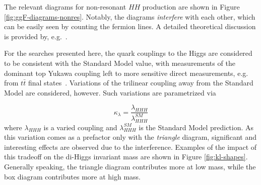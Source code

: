 The relevant diagrams for non-resonant $HH$ production are shown in Figure \ref{fig:ggF-diagrams-nonres}.
Notably, the diagrams \emph{interfere} with each other, which can be easily seen by counting the fermion lines. 
A detailed theoretical discussion is provided by, e.g.~\cite{Dawson-2015}.

For the searches presented here, the quark couplings to the Higgs are considered to be consistent with the Standard 
Model value, with measurements of the dominant top Yukawa coupling left to more sensitive direct measurements, e.g. from 
$t\bar{t}$ final states~\cite{top-Yukawa}. Variations of the trilinear coupling away from the Standard 
Model are considered, however. Such variations are parametrized via 

\begin{equation}
\kappa_{\lambda} = \frac{\lambda_{HHH}}{\lambda_{HHH}^{SM}}
\end{equation}
where $\lambda_{HHH}$ is a varied coupling and $\lambda_{HHH}^{SM}$ is the Standard Model prediction.
As this variation comes as a prefactor only with the \emph{triangle} diagram, significant and interesting 
effects are observed due to the interference. Examples of the impact of this tradeoff on the di-Higgs invariant 
mass are shown in Figure \ref{fig:kl-shapes}. Generally speaking, the triangle diagram contributes more at low mass, 
while the box diagram contributes more at high mass. 

